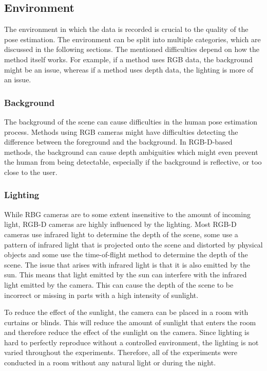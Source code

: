 \subsection{Environment}

The environment in which the data is recorded is crucial to the quality of the pose estimation. The environment can be split into multiple categories, which are discussed in the following sections. The mentioned difficulties depend on how the method itself works. For example, if a method uses RGB data, the background might be an issue, whereas if a method uses depth data, the lighting is more of an issue.

\subsubsection{Background}

The background of the scene can cause difficulties in the human pose estimation process. Methods using RGB cameras might have difficulties detecting the difference between the foreground and the background. In RGB-D-based methods, the background can cause depth ambiguities which might even prevent the human from being detectable, especially if the background is reflective, or too close to the user.

\subsubsection{Lighting}

While RBG cameras are to some extent insensitive to the amount of incoming light, RGB-D cameras are highly influenced by the lighting. Most RGB-D cameras use infrared light to determine the depth of the scene, some use a pattern of infrared light that is projected onto the scene and distorted by physical objects and some use the time-of-flight method to determine the depth of the scene. The issue that arises with infrared light is that it is also emitted by the sun. This means that light emitted by the sun can interfere with the infrared light emitted by the camera. This can cause the depth of the scene to be incorrect or missing in parts with a high intensity of sunlight.

To reduce the effect of the sunlight, the camera can be placed in a room with curtains or blinds. This will reduce the amount of sunlight that enters the room and therefore reduce the effect of the sunlight on the camera. Since lighting is hard to perfectly reproduce without a controlled environment, the lighting is not varied throughout the experiments. Therefore, all of the experiments were conducted in a room without any natural light or during the night.

